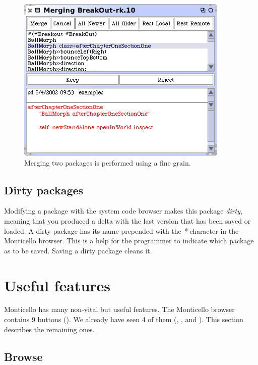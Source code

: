 \documentclass[a4paper,10pt,twoside]{book}
\begin{document}

\begin{figure}[ht]\centering
	\includegraphics[width=.75\linewidth]{merger}
	\caption{Merging two packages is performed using a fine grain.}
\end{figure}

\subsection{Dirty packages}

Modifying a package with the system code browser makes this package \emph{dirty}, meaning that you produced a delta with the last version that has been saved or loaded. A dirty package has its name prepended with the \emph{*} character in the Monticello browser. This is a help for the programmer to indicate which package as to be saved. Saving a dirty package cleans it.

\section{Useful features}

Monticello has many non-vital but useful features. The Monticello browser contains 9 buttons (). We already have seen 4 of them (, ,  and ). This section describes the remaining ones.

\subsection{Browse} 
\end{document}
